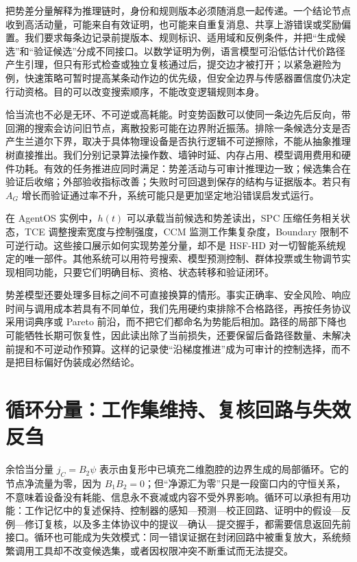 把势差分量解释为推理链时，身份和规则版本必须随消息一起传递。一个结论节点收到高活动量，可能来自有效证明，也可能来自重复消息、共享上游错误或奖励偏置。我们要求每条边记录前提版本、规则标识、适用域和反例条件，并把“生成候选”和“验证候选”分成不同接口。以数学证明为例，语言模型可沿低估计代价路径产生引理，但只有形式检查或独立复核通过后，提交边才被打开；以紧急避险为例，快速策略可暂时提高某条动作边的优先级，但安全边界与传感器置信度仍决定行动资格。目的可以改变搜索顺序，不能改变逻辑规则本身。

恰当流也不必是无环、不可逆或高耗能。时变势函数可以使同一条边先后反向，带回溯的搜索会访问旧节点，离散投影可能在边界附近振荡。排除一条候选分支是否产生兰道尔下界，取决于具体物理设备是否执行逻辑不可逆擦除，不能从抽象推理树直接推出。我们分别记录算法操作数、墙钟时延、内存占用、模型调用费用和硬件功耗。有效的任务推进应同时满足：势差活动与可审计推理边一致；候选集合在验证后收缩；外部验收指标改善；失败时可回退到保存的结构与证据版本。若只有 $A_G$ 增长而验证通过率不升，系统可能只是更加坚定地沿错误启发式运行。

在 AgentOS 实例中，$h(t)$ 可以承载当前候选和势差读出，SPC 压缩任务相关状态，TCE 调整搜索宽度与控制强度，CCM 监测工作集复杂度，Boundary 限制不可逆行动。这些接口展示如何实现势差分量，却不是 HSF-HD 对一切智能系统规定的唯一部件。其他系统可以用符号搜索、模型预测控制、群体投票或生物调节实现相同功能，只要它们明确目标、资格、状态转移和验证闭环。

势差模型还要处理多目标之间不可直接换算的情形。事实正确率、安全风险、响应时间与调用成本若具有不同单位，我们先用硬约束排除不合格路径，再按任务协议采用词典序或 Pareto 前沿，而不把它们都命名为势能后相加。路径的局部下降也可能牺牲长期可恢复性，因此读出除了当前损失，还要保留后备路径数量、未解决前提和不可逆动作预算。这样的记录使“沿梯度推进”成为可审计的控制选择，而不是把目标偏好伪装成必然结论。

\section{循环分量：工作集维持、复核回路与失效反刍}
\label{sec:section_428}

余恰当分量 $j_C=B_2\psi$ 表示由复形中已填充二维胞腔的边界生成的局部循环。它的节点净流量为零，因为 $B_1B_2=0$；但“净源汇为零”只是一段窗口内的守恒关系，不意味着设备没有耗能、信息永不衰减或内容不受外界影响。循环可以承担有用功能：工作记忆中的复述保持、控制器的感知—预测—校正回路、证明中的假设—反例—修订复核，以及多主体协议中的提议—确认—提交握手，都需要信息返回先前接口。循环也可能成为失效模式：同一错误证据在封闭回路中被重复放大，系统频繁调用工具却不改变候选集，或者因权限冲突不断重试而无法提交。

